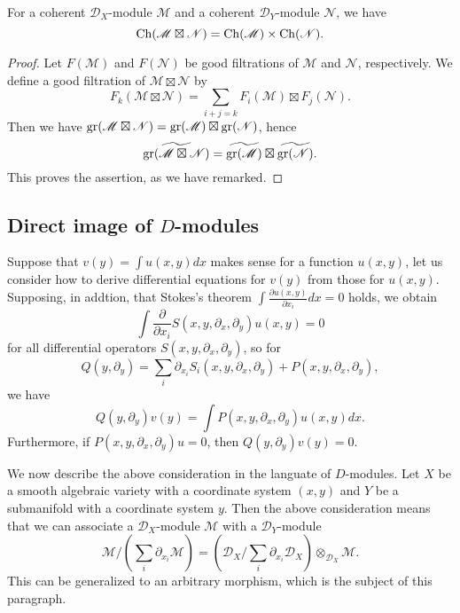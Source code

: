 \begin{proposition}\label{D-module characteristic variety of external tensor char}
For a coherent $\mathscr{D}_X$-module $\mathscr{M}$ and a coherent $\mathscr{D}_Y$-module $\mathscr{N}$, we have
\[\mathrm{Ch}(\mathscr{M}\boxtimes\mathscr{N})=\mathrm{Ch}(\mathscr{M})\times\mathrm{Ch}(\mathscr{N}).\]
\end{proposition}
\begin{proof}
Let $F(\mathscr{M})$ and $F(\mathscr{N})$ be good filtrations of $\mathscr{M}$ and $\mathscr{N}$, respectively. We define a good filtration of $\mathscr{M}\boxtimes\mathscr{N}$ by
\[F_k(\mathscr{M}\boxtimes\mathscr{N})=\sum_{i+j=k}F_i(\mathscr{M})\boxtimes F_j(\mathscr{N}).\]
Then we have $\mathrm{gr}(\mathscr{M}\boxtimes\mathscr{N})=\mathrm{gr}(\mathscr{M})\boxtimes\mathrm{gr}(\mathscr{N})$, hence
\[\widetilde{\mathrm{gr}(\mathscr{M}\boxtimes\mathscr{N})}=\widetilde{\mathrm{gr}(\mathscr{M})}\boxtimes\widetilde{\mathrm{gr}(\mathscr{N})}.\]
This proves the assertion, as we have remarked.
\end{proof}

\subsection{Direct image of \texorpdfstring{$D$}{D}-modules}
Suppose that $v(y)=\int u(x,y)dx$ makes sense for a function $u(x,y)$, let us consider how to derive differential equations for $v(y)$ from those for $u(x,y)$. Supposing, in addtion, that Stokes's theorem $\int\frac{\partial u(x,y)}{\partial x_i}dx=0$ holds, we obtain
\[\int\frac{\partial}{\partial x_i}S(x,y,\partial_x,\partial_y)u(x,y)=0\]
for all differential operators $S(x,y,\partial_x,\partial_y)$, so for
\[Q(y,\partial_y)=\sum_i\partial_{x_i}S_i(x,y,\partial_x,\partial_y)+P(x,y,\partial_x,\partial_y),\]
we have
\[Q(y,\partial_y)v(y)=\int P(x,y,\partial_x,\partial_y)u(x,y)dx.\]
Furthermore, if $P(x,y,\partial_x,\partial_y)u=0$, then $Q(y,\partial_y)v(y)=0$.\par
We now describe the above consideration in the languate of $D$-modules. Let $X$ be a smooth algebraic variety with a coordinate system $(x,y)$ and $Y$ be a submanifold with a coordinate system $y$. Then the above consideration means that we can associate a $\mathscr{D}_X$-module $\mathscr{M}$ with a $\mathscr{D}_Y$-module
\[\mathscr{M}/(\sum_i\partial_{x_i}\mathscr{M})=(\mathscr{D}_X/\sum_i\partial_{x_i}\mathscr{D}_X)\otimes_{\mathscr{D}_X}\mathscr{M}.\]
This can be generalized to an arbitrary morphism, which is the subject of this paragraph.\par

